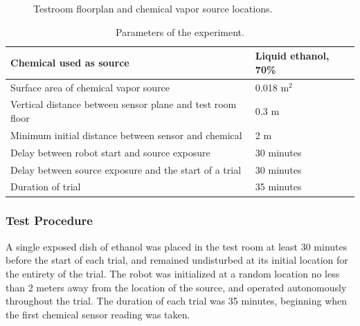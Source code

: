 \documentclass[submit, 12pt]{aiaa-pretty-modified}
\newcommand{\Tablewidthtwo}[0]{3in}
\begin{document}
\begin{figure}
\begin{center}
\caption{Testroom floorplan and chemical vapor source locations.}
\label{fig:testroom}
\end{center}
\end{figure}

\begin{table}
\caption{Parameters of the experiment.}
\begin{center}
\begin{tabular}{|p{\Tablewidthtwo}|p{\Tablewidthtwo}|}
\hline
Chemical used as source & Liquid ethanol, 70\% \\ \hline
Surface area of chemical vapor source & 0.018 $\text{m}^2$\\ \hline
Vertical distance between sensor plane and
test room floor & 0.3 $\text{m}$ \\ \hline
Minimum initial distance between sensor and chemical & 2 $\text{m}$ \\ \hline
Delay between robot start and source exposure & 30 minutes \\ \hline
Delay between source exposure and the start of a trial & 30 minutes \\ \hline
Duration of trial & 35 minutes \\ \hline
\end{tabular}
\end{center}
\label{tab:parameters}
\end{table}

\subsubsection{Test Procedure}
A single exposed dish of ethanol was placed in the test room at least 30
minutes before the start of each trial, and remained undisturbed at
its initial location for the entirety of the trial. The robot was
initialized at a random location no less than 2 meters away from the
location of the source, and operated  autonomously throughout
the trial.  The duration of each trial was 35 minutes, beginning when
the first chemical sensor reading was taken. 
\end{document}
